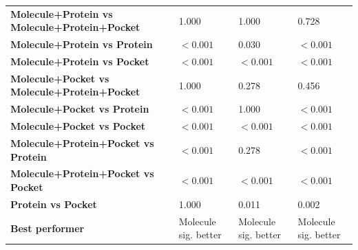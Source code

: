 \begin{table}[H]
{\begin{tabular}{llll}
        \textbf{Molecule+Protein vs Molecule+Protein+Pocket} & 1.000 & 1.000 & 0.728 \\
        \textbf{Molecule+Protein vs Protein} & $< 0.001$ & 0.030 & $< 0.001$ \\
        \textbf{Molecule+Protein vs Pocket} & $< 0.001$ & $< 0.001$ & $< 0.001$ \\
        \textbf{Molecule+Pocket vs Molecule+Protein+Pocket} & 1.000 & 0.278 & 0.456 \\
        \textbf{Molecule+Pocket vs Protein} & $< 0.001$ & 1.000 & $< 0.001$ \\
        \textbf{Molecule+Pocket vs Pocket} & $< 0.001$ & $< 0.001$ & $< 0.001$ \\
        \textbf{Molecule+Protein+Pocket vs Protein} & $< 0.001$ & 0.278 & $< 0.001$ \\
        \textbf{Molecule+Protein+Pocket vs Pocket} & $< 0.001$ & $< 0.001$ & $< 0.001$ \\
        \textbf{Protein vs Pocket} & 1.000 & 0.011 & 0.002 \\
        \textbf{Best performer} & Molecule sig. better & Molecule sig. better & Molecule sig. better \\
        \bottomrule
    \end{tabular}}
\end{table}
